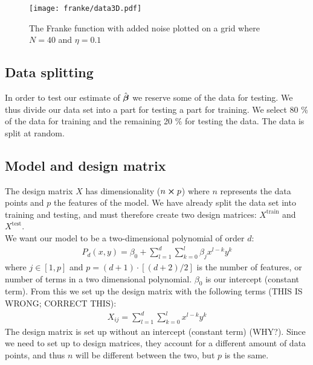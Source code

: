         \begin{figure}
            \texttt{[image: franke/data3D.pdf]}
            \caption{The Franke function with added noise plotted on a grid where $N=40$ and $\eta=0.1$}
            \label{fig:franke_function_noise}
        \end{figure}

    \subsection{Data splitting}\label{sec:splitting}
        In order to test our estimate of $\hat{\boldsymbol{\beta}}$ we reserve some of the data for testing. We thus divide our data set into a part for testing a part for training. We select 80 \% of the data for training and the remaining 20 \% for testing the data. The data is split at random. 




    \subsection{Model and design matrix}\label{sec:model}
        The design matrix $X$ has dimensionality ($n\cross p$) where $n$ represents the data points and $p$ the features of the model. We have already split the data set into training and testing, and must therefore create two design matrices: $X^{\text{train}}$ and $X^{\text{test}}$. 
        \\
        We want our model to be a two-dimensional polynomial of order $d$:
        \begin{align*}
            P_d(x,y) = \beta_0 + \sum_{l=1}^d\sum_{k=0}^{l} \beta_jx^{l-k}y^k
        \end{align*}
        where $j\in[1,p]$ and $p=(d+1)\cdot\left[(d+2)/2\right]$ is the number of features, or number of terms in a two dimensional polynomial. $\beta_0$ is our intercept (constant term). From this we set up the design matrix with the following terms (THIS IS WRONG; CORRECT THIS):
        \begin{align}\label{eq:designmatrixequation}
            X_{ij} = \sum_{l=1}^d\sum_{k=0}^{l} x^{l-k}y^k
        \end{align}
        The design matrix is set up without an intercept (constant term) (WHY?). Since we need to set up to design matrices, they account for a different amount of data points, and thus $n$ will be different between the two, but $p$ is the same. 





